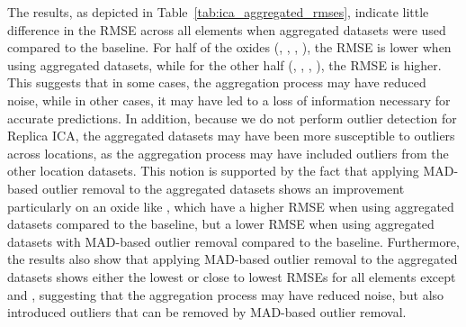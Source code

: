 The results, as depicted in Table~\ref{tab:ica_aggregated_rmses}, indicate little difference in the RMSE across all elements when aggregated datasets were used compared to the baseline.
For half of the oxides (, , , ), the RMSE is lower when using aggregated datasets, while for the other half (, , , ), the RMSE is higher.
This suggests that in some cases, the aggregation process may have reduced noise, while in other cases, it may have led to a loss of information necessary for accurate predictions.
In addition, because we do not perform outlier detection for Replica ICA, the aggregated datasets may have been more susceptible to outliers across locations, as the aggregation process may have included outliers from the other location datasets.
This notion is supported by the fact that applying MAD-based outlier removal to the aggregated datasets shows an improvement particularly on an oxide like , which have a higher RMSE when using aggregated datasets compared to the baseline, but a lower RMSE when using aggregated datasets with MAD-based outlier removal compared to the baseline.
Furthermore, the results also show that applying MAD-based outlier removal to the aggregated datasets shows either the lowest or close to lowest RMSEs for all elements except  and , suggesting that the aggregation process may have reduced noise, but also introduced outliers that can be removed by MAD-based outlier removal.
